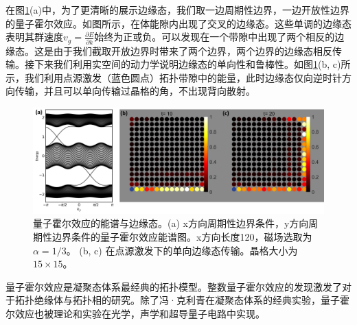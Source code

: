 在图\ref{fig:HallEdgeState}(a)中，为了更清晰的展示边缘态，我们取一边周期性边界，一边开放性边界的量子霍尔效应。如图所示，在体能隙内出现了交叉的边缘态。这些单调的边缘态表明其群速度$v_g=\frac{\partial E}{\partial k}$始终为正或负。可以发现在一个带隙中出现了两个相反的边缘态。这是由于我们截取开放边界时带来了两个边界，两个边界的边缘态相反传输。接下来我们利用实空间的动力学说明边缘态的单向性和鲁棒性。如图\ref{fig:HallEdgeState}(b, c)所示，我们利用点源激发（蓝色圆点）拓扑带隙中的能量，此时边缘态仅向逆时针方向传输，并且可以单向传输过晶格的角，不出现背向散射。

\begin{figure}[htbp]
	\centering
	\includegraphics[width=1\textwidth]{figure/Introduction/HallEdgeState.png}
 \caption{量子霍尔效应的能谱与边缘态。(a) x方向周期性边界条件，y方向周期性边界条件的量子霍尔效应能谱图。x方向长度120，磁场选取为$\alpha=1/3$。
	(b, c) 在点源激发下的单向边缘态传输。晶格大小为$15\times15$。} 
 \label{fig:HallEdgeState}
\end{figure}

量子霍尔效应是凝聚态体系最经典的拓扑模型。整数量子霍尔效应的发现激发了对于拓扑绝缘体与拓扑相的研究。除了冯·克利青在凝聚态体系的经典实验\cite{klitzing1980new}，量子霍尔效应也被理论和实验在光学\cite{Haldane2008prl,Haldane2008pra,ZhengWang2008prl,wang2009observation,hafezi2011robust,hafezi2013imaging,rechtsman2013strain}，声学\cite{wen2019acoustic}和超导量子电路\cite{xiang2023simulating,wang2024realization}中实现。

